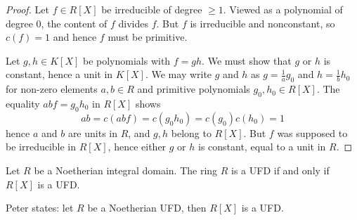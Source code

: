 \documentclass[12pt, a4paper]{article}
\begin{document}
\begin{proof}
    Let \( f \in R[X] \) be irreducible of degree \( \geq 1 \). Viewed as a polynomial of degree 0, the content of \( f \) divides \( f \). But \( f \) is irreducible and nonconstant, so \( c(f) = 1 \) and hence \( f \) must be primitive.

    Let \( g, h \in K[X] \) be polynomials with \( f = gh \). We must show that \( g \) or \( h \) is constant, hence a unit in \( K[X] \). We may write \( g \) and \( h \) as \( g = \frac{1}{a}g_0 \) and \( h = \frac{1}{b}h_0 \) for non-zero elements \( a, b \in R \) and primitive polynomials \( g_0, h_0 \in R[X] \). The equality \( abf = g_0h_0 \) in \( R[X] \) shows
    \[
    ab = c(abf) = c(g_0h_0) = c(g_0)c(h_0) = 1
    \]
    hence \( a \) and \( b \) are units in \( R \), and \( g, h \) belong to \( R[X] \). But \( f \) was supposed to be irreducible in \( R[X] \), hence either \( g \) or \( h \) is constant, equal to a unit in \( R \). 
\end{proof}

\begin{mdthm}
    Let \(R\) be a Noetherian integral domain. The ring \(R\) is a UFD if and only if \(R[X]\) is a UFD.
\end{mdthm}

\begin{mdnote}
    Peter states: let \(R\) be a Noetherian UFD, then \(R[X]\) is a UFD.
\end{mdnote}
\end{document}

